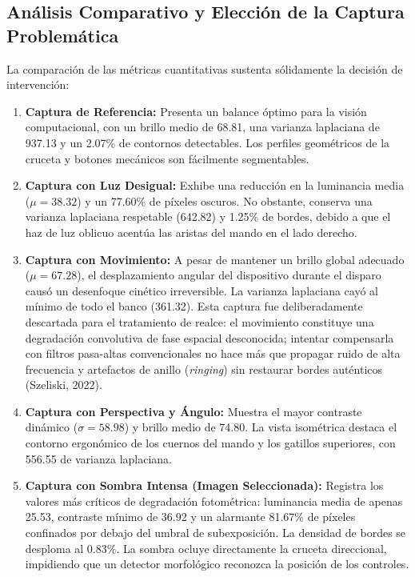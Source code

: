\documentclass[12pt,letterpaper]{article}
\begin{document}
\subsection{An\'alisis Comparativo y Elecci\'on de la Captura Problem\'atica}
La comparaci\'on de las m\'etricas cuantitativas sustenta s\'olidamente la decisi\'on de intervenci\'on:
\begin{enumerate}
    \item \textbf{Captura de Referencia:} Presenta un balance \'optimo para la visi\'on computacional, con un brillo medio de 68.81, una varianza laplaciana de 937.13 y un 2.07\% de contornos detectables. Los perfiles geom\'etricos de la cruceta y botones mec\'anicos son f\'acilmente segmentables.
    \item \textbf{Captura con Luz Desigual:} Exhibe una reducci\'on en la luminancia media ($\mu = 38.32$) y un 77.60\% de p\'ixeles oscuros. No obstante, conserva una varianza laplaciana respetable (642.82) y 1.25\% de bordes, debido a que el haz de luz oblicuo acent\'ua las aristas del mando en el lado derecho.
    \item \textbf{Captura con Movimiento:} A pesar de mantener un brillo global adecuado ($\mu = 67.28$), el desplazamiento angular del dispositivo durante el disparo caus\'o un desenfoque cin\'etico irreversible. La varianza laplaciana cay\'o al m\'inimo de todo el banco (361.32). Esta captura fue deliberadamente descartada para el tratamiento de realce: el movimiento constituye una degradaci\'on convolutiva de fase espacial desconocida; intentar compensarla con filtros pasa-altas convencionales no hace m\'as que propagar ruido de alta frecuencia y artefactos de anillo (\textit{ringing}) sin restaurar bordes aut\'enticos (Szeliski, 2022).
    \item \textbf{Captura con Perspectiva y \'Angulo:} Muestra el mayor contraste din\'amico ($\sigma = 58.98$) y brillo medio de 74.80. La vista isom\'etrica destaca el contorno ergon\'omico de los cuernos del mando y los gatillos superiores, con 556.55 de varianza laplaciana.
    \item \textbf{Captura con Sombra Intensa (Imagen Seleccionada):} Registra los valores m\'as cr\'iticos de degradaci\'on fotom\'etrica: luminancia media de apenas 25.53, contraste m\'inimo de 36.92 y un alarmante 81.67\% de p\'ixeles confinados por debajo del umbral de subexposici\'on. La densidad de bordes se desploma al 0.83\%. La sombra ocluye directamente la cruceta direccional, impidiendo que un detector morfol\'ogico reconozca la posici\'on de los controles.
\end{enumerate}
\end{document}
